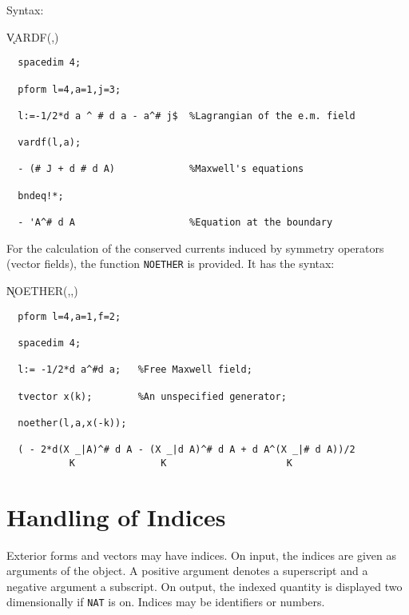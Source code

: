 \documentclass[11pt,letterpaper]{book}
\begin{document}
Syntax:

\hspace*{2em} \k{VARDF}(,)

\example{}

{\small\begin{verbatim}
  spacedim 4;

  pform l=4,a=1,j=3;

  l:=-1/2*d a ^ # d a - a^# j$  %Lagrangian of the e.m. field

  vardf(l,a);

  - (# J + d # d A)             %Maxwell's equations

  bndeq!*;

  - 'A^# d A                    %Equation at the boundary
\end{verbatim}}
For the calculation of the conserved currents induced by symmetry
operators (vector fields), the function {\tt NOETHER}\label{NOETHER}
is provided.  It has the syntax:

\hspace*{2em}
\k{NOETHER}(,,)

\example{}

{\small\begin{verbatim}
  pform l=4,a=1,f=2;

  spacedim 4;

  l:= -1/2*d a^#d a;   %Free Maxwell field;

  tvector x(k);        %An unspecified generator;

  noether(l,a,x(-k));

  ( - 2*d(X _|A)^# d A - (X _|d A)^# d A + d A^(X _|# d A))/2
           K               K                     K
\end{verbatim}}


\section{Handling of Indices}
Exterior forms and vectors may have indices.  On input, the indices
are given as arguments of the object.  A positive argument denotes a
superscript and a negative argument a subscript.  On output, the
indexed quantity is displayed two dimensionally if {\tt NAT} is on.
Indices may be identifiers or numbers.

\example{}
\end{document}

